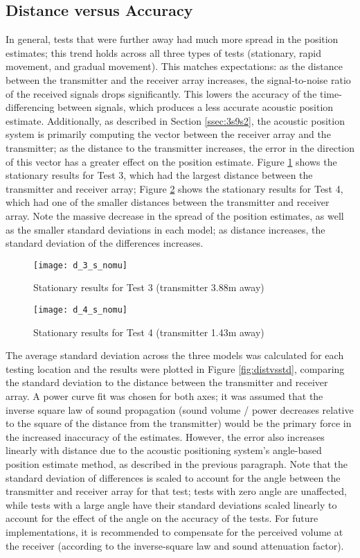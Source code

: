 \documentclass[11pt]{ucthesisCP}
\begin{document}
\subsection{Distance versus Accuracy} \label{ssec:6s2s1}
In general, tests that were further away had much more spread in the position estimates; this trend holds across all three types of tests (stationary, rapid movement, and gradual movement). This matches expectations: as the distance between the transmitter and the receiver array increases, the signal-to-noise ratio of the received signals drops significantly. This lowers the accuracy of the time-differencing between signals, which produces a less accurate acoustic position estimate. Additionally, as described in Section \ref{ssec:3s9s2}, the acoustic position system is primarily computing the vector between the receiver array and the transmitter; as the distance to the transmitter increases, the error in the direction of this vector has a greater effect on the position estimate. Figure \ref{fig:d_3_s_nomu} shows the stationary results for Test 3, which had the largest distance between the transmitter and receiver array; Figure \ref{fig:d_4_s_nomu} shows the stationary results for Test 4, which had one of the smaller distances between the transmitter and receiver array. Note the massive decrease in the spread of the position estimates, as well as the smaller standard deviations in each model; as distance increases, the standard deviation of the differences increases.

\begin{figure}[htbp]
	\centering
	\texttt{[image: d\_3\_s\_nomu]}
	\caption{Stationary results for Test 3 (transmitter 3.88m away)}
	\label{fig:d_3_s_nomu}
\end{figure}

\begin{figure}[htbp]
	\centering
	\texttt{[image: d\_4\_s\_nomu]}
	\caption{Stationary results for Test 4 (transmitter 1.43m away)}
	\label{fig:d_4_s_nomu}
\end{figure}

The average standard deviation across the three models was calculated for each testing location and the results were plotted in Figure \ref{fig:distvsstd}, comparing the standard deviation to the distance between the transmitter and receiver array. A power curve fit was chosen for both axes; it was assumed that the inverse square law of sound propagation (sound volume / power decreases relative to the square of the distance from the transmitter) would be the primary force in the increased inaccuracy of the estimates. However, the error also increases linearly with distance due to the acoustic positioning system's angle-based position estimate method, as described in the previous paragraph. Note that the standard deviation of differences is scaled to account for the angle between the transmitter and receiver array for that test; tests with zero angle are unaffected, while tests with a large angle have their standard deviations scaled linearly to account for the effect of the angle on the accuracy of the tests. For future implementations, it is recommended to compensate for the perceived volume at the receiver (according to the inverse-square law and sound attenuation factor).
\end{document}
